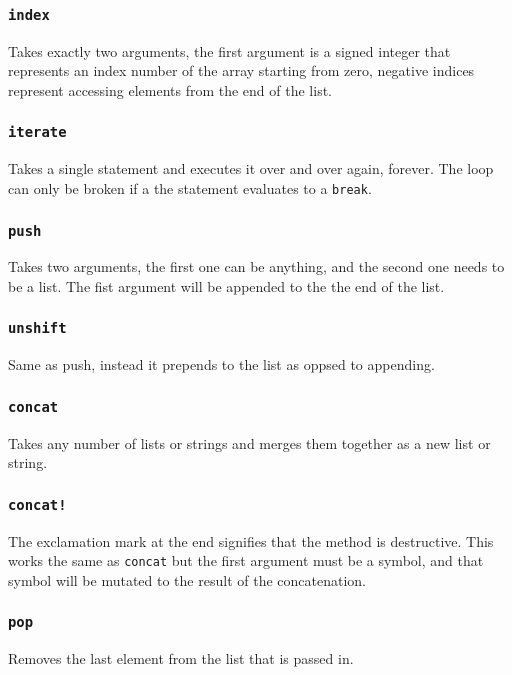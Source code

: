 \documentclass{article}
\newcommand{\code}[1]{\texttt{#1}}
\begin{document}
    \subsubsection{\code{index}}
      Takes exactly two arguments, the first argument is a signed
      integer that represents an index number of the array starting from
      zero, negative indices represent accessing elements from the end of
      the list.

    \subsubsection{\code{iterate}}
      Takes a single statement and executes it over and over again, forever.
      The loop can only be broken if a the statement evaluates to a \code{break}.

    \subsubsection{\code{push}}
      Takes two arguments, the first one can be anything, and the second
      one needs to be a list.  The fist argument will be appended to the
      the end of the list.

    \subsubsection{\code{unshift}}
      Same as push, instead it prepends to the list as oppsed to
      appending.


    \subsubsection{\code{concat}}
      Takes any number of lists or strings and merges them together as
      a new list or string.

    \subsubsection{\code{concat!}}
      The exclamation mark at the end signifies that the method is
      destructive. This works the same as \code{concat} but the first
      argument must be a symbol, and that symbol will be mutated to
      the result of the concatenation.

    \subsubsection{\code{pop}}
      Removes the last element from the list that is passed in.
\end{document}
